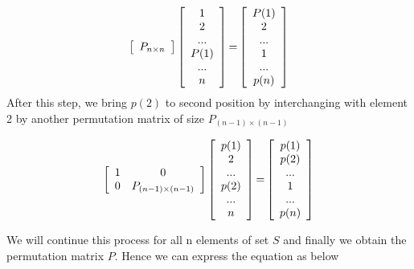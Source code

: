 \documentclass[12pt]{article}
\newcommand\tab[1][1cm]{\hspace*{#1}}
\begin{document}
\[ \left[ \begin{array}{ccc}
  P_{n\times n}\\
\end{array} \right]
\left[ \begin{array}{ccc}
  1 \\
  2 \\
  ... \\
  P(1)\\
  ...\\
  n \\  
\end{array} \right]
\textnormal{=} 
\left[ \begin{array}{ccc}
  P(1) \\
  2 \\
  ... \\
  1\\
  ...\\
  p(n) \\
\end{array} \right]
\]
\noindent
\tab After this step, we bring $p(2)$ to second position by interchanging with element 2 by another permutation matrix of size $P_{(n-1) \times (n-1)}$

\[ \left[ \begin{array}{ccc}
  1 & 0\\
  0 & P_{(n-1) \times (n-1)}\\
\end{array} \right]
\left[ \begin{array}{ccc}
  p(1) \\
  2 \\
  ... \\
  p(2)\\
  ...\\
  n \\  
\end{array} \right]
\textnormal{=} 
\left[ \begin{array}{ccc}
  p(1) \\
  p(2) \\
  ... \\
  1\\
  ...\\
  p(n) \\
\end{array} \right]
\]

\noindent
\tab We will continue this process for all n elements of set $S$ and finally we obtain the permutation matrix $P$. Hence we can express the equation as below\\
\end{document}
